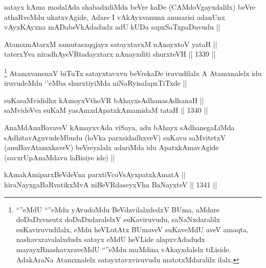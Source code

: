 \begin{artha}
satayx kAma modalAda shabadxdiMda beVre kaDe (CAMdoVgayxdalilx) beVre athaRveMdu ukatxvAgide, Adare I vAkAyxvanunx anusarisi adanUnx vAyxKAyxna mADabeVkAdadudx adU kUDa sapxSaTxpaDuvudu ||
\end{artha}


\begin{shl}
AtamxmAtarxM samutasxqqjayx satayxtavxM nAnayxtoV yataH || \\
taterxYva niradhAyeVRtadayxtarx nAnayxditi shurxteVH ||  1339 ||  
\end{shl}

\begin{artha}
\footnote{``\stext''eMdU ``\stext''eMdu yAvudoMdu BeVdavilalxdedxV BUma, aMdare doDaDxvasutx doDaDxdaralelxV suKaviruvudu, saNaNxdaralilx suKaviruvudilalx, eMdu heVLutAtx BUmaveV suKaveMdU aveV amaqta, nashavxravalalxdudx satayx eMdU heVLide alapxvAdadudx mayayxRnashavxraveMdU ``\stext''eMdu muMdina vAkayxdalelx tiLiside. AdakAraNa Atamxnalelx satayxtavxviruvudu matotxMdaralilx ilalx.}
AtamxvanenxV biTuTx satayxtavxvu beVrekaDe iruvudilalx A Atamxnalelx idu iruvudeMdu `\stext'eMba shurxtiyiMda niNaRyisalapxTiTxde ||
\end{artha}


\begin{shl}
suKasaMvididhx kAmoyxV\s thoVR bAhayxsAdhanasAdhanaH || \\
saMvideVva suKaM yasAmxdApatxkAmamidaM tataH ||  1340 ||  
\end{shl}

\begin{artha}
AnaMdAnuBavaveV kAmayxvAda viSaya, adu bAhayx sAdhanegaLiMda sAdhitavAguvudeMbudu (loVka parxsidadhxveV) suKavu saMvitetxV (anuBavAtamxkaveV) beVreyalalx adariMda idu ApatxkAmavAgide (savxrUpAnaMdavu laBisiye ide) ||
\end{artha}


\begin{shl}
kAmakAmiparxBeVdeVna parxtiVcoV\s sAyx\s \s patxkAmatA || \\
hiraNayxgaBaRvatikxMvA niBeVRdaseyxVha BaNayxteV ||  1341 ||  
\end{shl}

